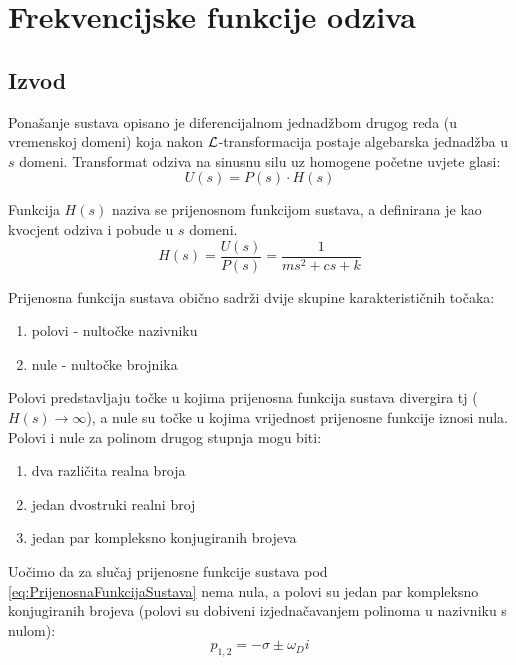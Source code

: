 \section{Frekvencijske funkcije odziva}
\subsection{Izvod}
Ponašanje sustava opisano je diferencijalnom jednadžbom drugog reda (u vremenskoj
domeni) koja nakon $\mathcal{L}$-transformacija postaje algebarska jednadžba u $s$ domeni.
Transformat odziva na sinusnu silu uz homogene početne uvjete glasi:
\begin{equation}
    U(s) = P(s)\cdot H(s) 
\end{equation}

Funkcija $H(s)$ naziva se prijenosnom funkcijom sustava, a definirana je kao
kvocjent odziva i pobude u $s$ domeni.
\begin{equation} \label{eq:PrijenosnaFunkcijaSustava}
    H(s)=\frac{U(s)}{P(s)} = \frac{1}{ms^2+cs+k}%
\end{equation}

Prijenosna funkcija sustava obično sadrži dvije skupine karakterističnih točaka:
\begin{enumerate}
    \item polovi - nultočke nazivniku
    \item nule - nultočke brojnika
\end{enumerate}

Polovi predstavljaju točke u kojima prijenosna funkcija sustava divergira tj
($H(s)\to\infty$), a nule su točke u kojima vrijednost prijenosne funkcije iznosi
nula. Polovi i nule za polinom drugog stupnja mogu biti:
\begin{enumerate}
    \item dva različita realna broja
    \item jedan dvostruki realni broj
    \item jedan par kompleksno konjugiranih brojeva
\end{enumerate}

Uočimo da za slučaj prijenosne funkcije sustava pod
\eqref{eq:PrijenosnaFunkcijaSustava} nema nula, a polovi su jedan par kompleksno
konjugiranih brojeva (polovi su dobiveni izjednačavanjem polinoma u nazivniku s
nulom):
\begin{equation}
    p_{1,2} = -\sigma\pm\omega_Di
\end{equation}

